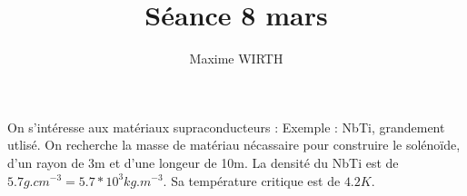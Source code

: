 \documentclass{article}
\author{Maxime WIRTH}
\title{Séance 8 mars}
\begin{document}
\maketitle

On s'intéresse aux matériaux supraconducteurs :
Exemple : NbTi, grandement utlisé.
On recherche la masse de matériau nécassaire pour construire le solénoïde, d'un rayon de 3m et d'une longeur de 10m.
La densité du NbTi est de $5.7 g.cm^{-3} = 5.7*10^3 kg.m^{-3}$.
Sa température critique est de $4.2K$.
\end{document}
